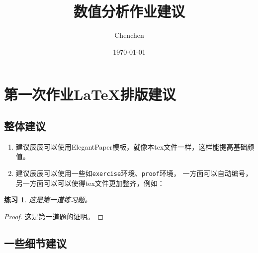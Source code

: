 \documentclass[lang=cn,bibend=bibtex]{elegantpaper}
\title{数值分析作业建议}
\author{Chenchen}
\date{\today}
\theoremstyle{boldexercise}
\newtheorem{exercise}{练习}[section]
\begin{document}
\maketitle

\section{第一次作业\LaTeX{}排版建议}

\subsection{整体建议}

\begin{enumerate}
\item 建议辰辰可以使用ElegantPaper模板，就像本tex文件一样，这样能提高基础颜值。
\item 建议辰辰可以使用一些如\lstinline|exercise|环境、\lstinline|proof|环境，
  一方面可以自动编号，另一方面可以可以使得tex文件更加整齐，例如：
\end{enumerate}

\begin{exercise}
  这是第一道练习题。
\end{exercise}

\begin{proof}
  这是第一道题的证明。
\end{proof}

\subsection{一些细节建议}
\end{document}
